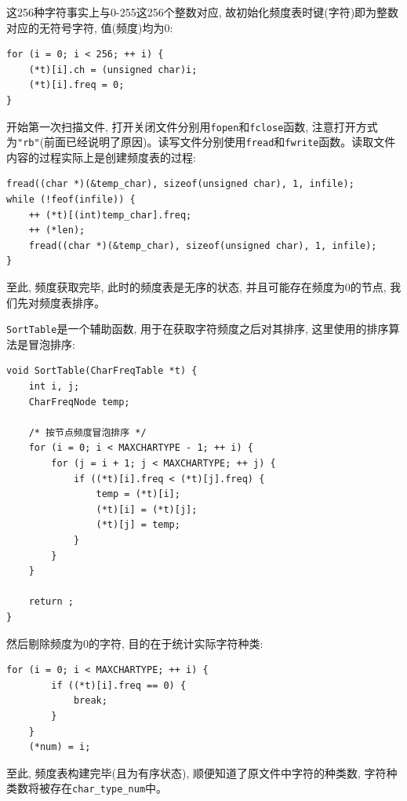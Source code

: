 \documentclass{ctexart}
\begin{document}
这256种字符事实上与0-255这256个整数对应, 故初始化频度表时键(字符)即为整数对应的无符号字符, 值(频度)均为0:

{\setmainfont{Courier New Bold}              
\begin{lstlisting}
for (i = 0; i < 256; ++ i) {
    (*t)[i].ch = (unsigned char)i;
    (*t)[i].freq = 0;
}
\end{lstlisting}}

开始第一次扫描文件, 打开关闭文件分别用\texttt{fopen}和\texttt{fclose}函数, 注意打开方式为\texttt{"rb"}(前面已经说明了原因)。读写文件分别使用\texttt{fread}和\texttt{fwrite}函数。读取文件内容的过程实际上是创建频度表的过程:

{\setmainfont{Courier New Bold}              
\begin{lstlisting}
fread((char *)(&temp_char), sizeof(unsigned char), 1, infile);
while (!feof(infile)) {
    ++ (*t)[(int)temp_char].freq;
    ++ (*len);
    fread((char *)(&temp_char), sizeof(unsigned char), 1, infile);
}
\end{lstlisting}}

至此, 频度获取完毕, 此时的频度表是无序的状态, 并且可能存在频度为0的节点, 我们先对频度表排序。

\texttt{SortTable}是一个辅助函数, 用于在获取字符频度之后对其排序, 这里使用的排序算法是冒泡排序:

{\setmainfont{Courier New Bold}              
\begin{lstlisting}
void SortTable(CharFreqTable *t) {
    int i, j;
    CharFreqNode temp;

    /* 按节点频度冒泡排序 */
    for (i = 0; i < MAXCHARTYPE - 1; ++ i) {
        for (j = i + 1; j < MAXCHARTYPE; ++ j) {
            if ((*t)[i].freq < (*t)[j].freq) {
                temp = (*t)[i];
                (*t)[i] = (*t)[j];
                (*t)[j] = temp;
            }
        }
    }

    return ;
}
\end{lstlisting}}

然后剔除频度为0的字符, 目的在于统计实际字符种类:

{\setmainfont{Courier New Bold}              
\begin{lstlisting}
for (i = 0; i < MAXCHARTYPE; ++ i) {
        if ((*t)[i].freq == 0) {
            break;
        }
    }
    (*num) = i;
\end{lstlisting}}

至此, 频度表构建完毕(且为有序状态), 顺便知道了原文件中字符的种类数, 字符种类数将被存在\texttt{char\_type\_num}中。
\end{document}
